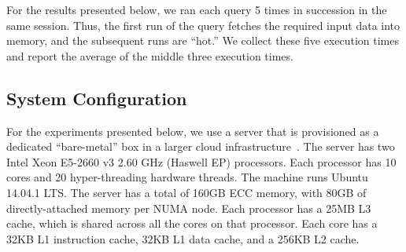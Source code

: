 For the results presented below, we ran each query 5 times in succession in the same session. Thus, the first run of the query fetches the required input data into memory, and the subsequent runs are ``hot.'' We collect these five execution times and report the average of the middle three execution times.





\subsection{System Configuration} \label{exp-system}
For the experiments presented below, we use a server that is provisioned as a dedicated ``bare-metal'' box in a larger cloud infrastructure~\cite{RicciEide:login14}. The server has two Intel Xeon E5-2660 v3 2.60 GHz (Haswell EP) processors. Each processor has 10 cores and 20 hyper-threading hardware threads. The machine runs Ubuntu 14.04.1 LTS. The server has a total of 160GB ECC memory, %
with 80GB of directly-attached memory per NUMA node. Each processor has a 25MB  L3 cache, which is shared across all the cores on that processor. Each core has a 32KB L1 instruction cache, 32KB L1 data cache, and a 256KB L2 cache.


